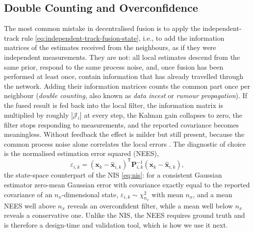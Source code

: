 \documentclass[graybox,envcountchap]{style/SNmono}
\providecommand{\DIFadd}[1]{{\protect\color{blue} #1}} %
\providecommand{\DIFdel}[1]{{\protect\color{red} #1}} %
\providecommand{\DIFaddbegin}{} %
\providecommand{\DIFaddend}{} %
\providecommand{\DIFdelbegin}{} %
\providecommand{\DIFdelend}{} %
\begin{document}
\subsection{Double Counting and Overconfidence}
\label{subsec:mas-double-counting}

The most common mistake in decentralised fusion is to apply the independent-track rule \eqref{eq:independent-track-fusion-state}, i.e., to add the information matrices of the estimates received from the neighbours, as if they were independent measurements. They are not: all local estimates descend from the same prior, respond to the same process noise, and, once fusion has been performed at least once, contain information that has already travelled through the network. Adding their information matrices counts the common part once per neighbour (\emph{double counting}, also known as \emph{data incest} or \emph{rumour propagation}). If the fused result is fed back into the local filter, the information matrix is multiplied by roughly $|\mathcal{J}_i|$ at every step, the Kalman gain collapses to zero, the filter stops responding to measurements, and the reported covariance becomes meaningless. Without feedback the effect is milder but still present, because the common process noise alone correlates the local errors \cite{barshalom2011tracking}. The diagnostic of choice is the normalised estimation error squared (NEES),
\begin{equation}
\varepsilon_{i,k}=(\mathbf{x}_k-\widehat{\mathbf{x}}_{i,k})^{\mathsf T}\mathbf{P}_{i,k}^{-1}(\mathbf{x}_k-\widehat{\mathbf{x}}_{i,k}),
\label{eq:nees-mas}
\end{equation}
the state-space counterpart of the NIS \eqref{eq:nis}: for a \DIFdelbegin \DIFdel{consistent Gaussian estimator }\DIFdelend \DIFaddbegin \DIFadd{zero-mean Gaussian error with covariance exactly equal to the reported covariance }\DIFaddend of an $n_x$-dimensional state, $\varepsilon_{i,k}\sim\chi^{2}_{n_x}$ with mean $n_x$, and a mean NEES well above $n_x$ reveals an overconfident filter, while a mean well below $n_x$ reveals a conservative one. Unlike the NIS, the NEES requires ground truth and is therefore a design-time and validation tool, which is how we use it next.
\end{document}
